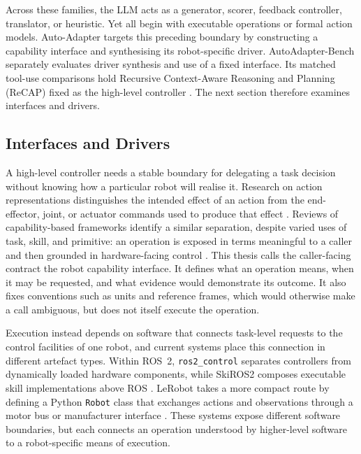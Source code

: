 Across these families, the LLM acts as a generator, scorer, feedback
controller, translator, or heuristic. Yet all begin with executable operations
or formal action models. Auto-Adapter targets this preceding boundary by
constructing a capability interface and synthesising its robot-specific
driver. AutoAdapter-Bench separately evaluates driver synthesis and use of a fixed
interface. Its matched tool-use comparisons hold Recursive Context-Aware
Reasoning and Planning (ReCAP) fixed as the high-level controller
\citep{zhang2025recap}. The next section therefore examines interfaces and
drivers.

\subsection{Interfaces and Drivers}
\label{sec:interfaces-drivers}

A high-level controller needs a stable boundary for delegating a task decision
without knowing how a particular robot will realise it. Research on action
representations distinguishes the intended effect of an action from the
end-effector, joint, or actuator commands used to produce that effect
\citep{zech2019action}. Reviews of capability-based frameworks identify a
similar separation, despite varied uses of task, skill, and primitive: an
operation is exposed in terms meaningful to a caller and then grounded in
hardware-facing control \citep{pantano2022capabilitysurvey}. This thesis calls
the caller-facing contract the robot capability interface. It defines what an
operation means, when it may be requested, and what evidence would demonstrate
its outcome. It also fixes conventions such as units and reference frames,
which would otherwise make a call ambiguous, but does not itself execute the
operation.

Execution instead depends on software that connects task-level requests to
the control facilities of one robot, and current systems place this connection
in different artefact types. Within ROS~2, \texttt{ros2\_control} separates
controllers from dynamically loaded hardware components, while SkiROS2 composes
executable skill implementations above ROS
\citep{macenski2022ros2,ros2control2026hardware,mayr2023skiros2}.
LeRobot takes a more compact route by defining a Python \texttt{Robot} class
that exchanges actions and observations through a motor bus or manufacturer
interface \citep{lerobot2026hardware}. These systems expose different software
boundaries, but each connects an operation understood by higher-level software
to a robot-specific means of execution.

